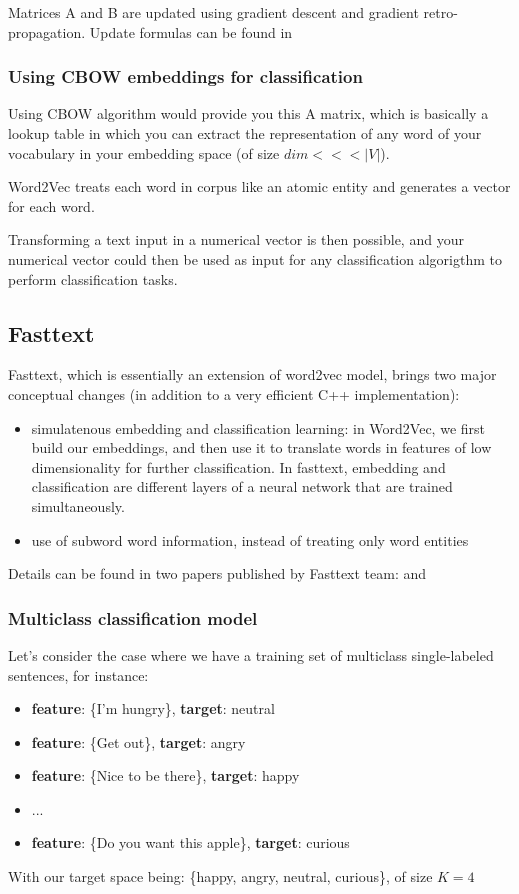 Matrices A and B are updated using gradient descent and gradient retro-propagation. Update formulas can be found in \cite{yolo}

\subsubsection{Using CBOW embeddings for classification}

Using CBOW algorithm would provide you this A matrix, which is basically a lookup table in which you can extract the representation of any word of your vocabulary in your embedding space (of size $dim <<< |V|$).

Word2Vec treats each word in corpus like an atomic entity and generates a vector for each word.

Transforming a text input in a numerical vector is then possible, and your numerical vector could then be used as input for any classification algorigthm to perform classification tasks.

\subsection{Fasttext}

Fasttext, which is essentially an extension of word2vec model, brings two major conceptual changes (in addition to a very efficient C++ implementation):
\begin{itemize}
	\item simulatenous embedding and classification learning: in Word2Vec, we first build our embeddings, and then use it to translate words in features of low dimensionality for further classification. In fasttext, embedding and classification are different layers of a neural network that are trained simultaneously.
	\item use of subword word information, instead of treating only word entities
\end{itemize}

Details can be found in two papers published by Fasttext team: \cite[Enriching Word Vectors with Subword Information]{fasttextEnriching} and \cite[Bag of Tricks for Efficient Text Classification]{fasttextTricks}

\subsubsection{Multiclass classification model}

Let's consider the case where we have a training set of multiclass single-labeled sentences, for instance:
\begin{itemize}
	\item \textbf{feature}: \{I'm hungry\}, \textbf{target}: neutral 
	\item \textbf{feature}: \{Get out\}, \textbf{target}: angry
	\item \textbf{feature}: \{Nice to be there\}, \textbf{target}: happy
	\item ...
	\item \textbf{feature}: \{Do you want this apple\}, \textbf{target}: curious
\end{itemize}
With our target space being: \{happy, angry, neutral, curious\}, of size $K=4$

